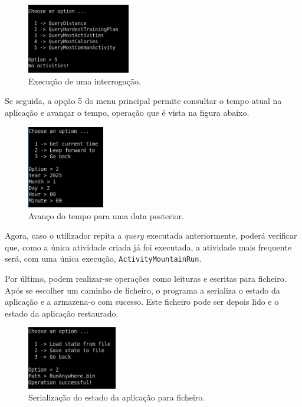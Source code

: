 \documentclass[12pt, a4paper]{article}
\begin{document}
\begin{figure}[H]
    \centering
    \includegraphics[width=0.4\textwidth]{RunQuery.png}
    \caption{Execução de uma interrogação.}
\end{figure}

Se seguida, a opção 5 do menu principal permite consultar o tempo atual na aplicação e avançar o
tempo, operação que é vista na figura abaixo. \\

\begin{figure}[H]
    \centering
    \includegraphics[width=0.3\textwidth]{LeapForward.png}
    \caption{Avanço do tempo para uma data posterior.}
\end{figure}

Agora, caso o utilizador repita a \emph{query} executada anteriormente, poderá verificar que, como a
única atividade criada já foi executada, a atividade mais frequente será, com uma única execução,
\texttt{ActivityMountainRun}.

Por último, podem realizar-se operações como leituras e escritas para ficheiro. Após se escolher um
caminho de ficheiro, o programa a serializa o estado da aplicação e a armazena-o com sucesso.
Este ficheiro pode ser depois lido e o estado da aplicação restaurado. \\

\begin{figure}[H]
    \centering
    \includegraphics[width=0.35\textwidth]{SaveFile.png}
    \caption{Serialização do estado da aplicação para ficheiro.}
\end{figure}
\end{document}
